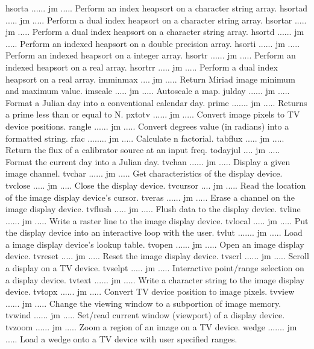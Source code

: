 {\eightpoint\begintt
hsorta ...... jm ..... Perform an index heapsort on a character string array. 
hsortad ..... jm ..... Perform a dual index heapsort on a character string array.
hsortar ..... jm ..... Perform a dual index heapsort on a character string array.
hsortd ...... jm ..... Perform an indexed heapsort on a double precision array. 
hsorti ...... jm ..... Perform an indexed heapsort on a integer array. 
\endtt}
{\eightpoint\begintt
hsortr ...... jm ..... Perform an indexed heapsort on a real array. 
hsortrr ..... jm ..... Perform a dual index heapsort on a real array. 
imminmax .... jm ..... Return Miriad image minimum and maximum value. 
imscale ..... jm ..... Autoscale a map. 
julday ...... jm ..... Format a Julian day into a conventional calendar day. 
\endtt}
{\eightpoint\begintt
prime ....... jm ..... Returns a prime less than or equal to N. 
pxtotv ...... jm ..... Convert image pixels to TV device positions. 
rangle ...... jm ..... Convert degrees value (in radians) into a formatted string. 
rfac ........ jm ..... Calculate n factorial. 
tabflux ..... jm ..... Return the flux of a calibrator source at an input freq. 
\endtt}
{\eightpoint\begintt
todayjul .... jm ..... Format the current day into a Julian day. 
tvchan ...... jm ..... Display a given image channel. 
tvchar ...... jm ..... Get characteristics of the display device. 
tvclose ..... jm ..... Close the display device. 
tvcursor .... jm ..... Read the location of the image display device's cursor. 
\endtt}
{\eightpoint\begintt
tveras ...... jm ..... Erase a channel on the image display device. 
tvflush ..... jm ..... Flush data to the display device. 
tvline ...... jm ..... Write a raster line to the image display device. 
tvlocal ..... jm ..... Put the display device into an interactive loop with the user. 
tvlut ....... jm ..... Load a image display device's lookup table. 
\endtt}
{\eightpoint\begintt
tvopen ...... jm ..... Open an image display device. 
tvreset ..... jm ..... Reset the image display device. 
tvscrl ...... jm ..... Scroll a display on a TV device. 
tvselpt ..... jm ..... Interactive point/range selection on a display device. 
tvtext ...... jm ..... Write a character string to the image display device. 
\endtt}
{\eightpoint\begintt
tvtopx ...... jm ..... Convert TV device position to image pixels. 
tvview ...... jm ..... Change the viewing window to a subportion of image memory.
tvwind ...... jm ..... Set/read current window (viewport) of a display device. 
tvzoom ...... jm ..... Zoom a region of an image on a TV device. 
wedge ....... jm ..... Load a wedge onto a TV device with user specified ranges.
\endtt}
